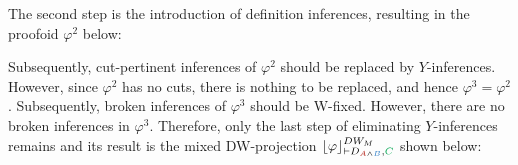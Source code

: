 \documentclass{llncs}
\begin{document}
\begin{example}
The second step is the introduction of definition inferences, resulting in the proofoid $\varphi^2$ below:

\begin{prooftree}
		 
	 
	 
						 
					 
					 
									 
								 
\end{prooftree}

Subsequently, cut-pertinent inferences of $\varphi^2$ should be replaced by $Y$-inferences. However, since $\varphi^2$ has no cuts, there is nothing to be replaced, and hence $\varphi^3 = \varphi^2$. Subsequently, broken inferences of $\varphi^3$ should be W-fixed. However, there are no broken inferences in $\varphi^3$. Therefore, only the last step of eliminating $Y$-inferences remains and its result is the mixed DW-projection $\projectionDWMixed{\varphi}{\seq D_{\hA{A} \structplus \hB{B}} , \hE{C}}$ shown below:

\begin{prooftree}
		 
	 
	 
							 
\end{prooftree}

\end{example}
\end{document}
